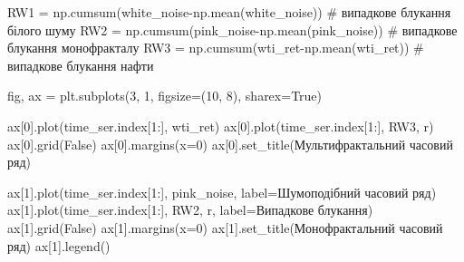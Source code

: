 \documentclass[
  letterpaper,
]{report}
\newenvironment{Shaded}{\begin{snugshade}}{\end{snugshade}}
\newcommand{\CommentTok}[1]{\textcolor[rgb]{0.37,0.37,0.37}{#1}}
\newcommand{\DecValTok}[1]{\textcolor[rgb]{0.68,0.00,0.00}{#1}}
\newcommand{\NormalTok}[1]{\textcolor[rgb]{0.00,0.23,0.31}{#1}}
\newcommand{\OperatorTok}[1]{\textcolor[rgb]{0.37,0.37,0.37}{#1}}
\newcommand{\StringTok}[1]{\textcolor[rgb]{0.13,0.47,0.30}{#1}}
\newcommand{\VariableTok}[1]{\textcolor[rgb]{0.07,0.07,0.07}{#1}}
\begin{document}
\begin{Shaded}
\begin{Highlighting}[]
\NormalTok{RW1 }\OperatorTok{=}\NormalTok{ np.cumsum(white\_noise}\OperatorTok{{-}}\NormalTok{np.mean(white\_noise)) }\CommentTok{\# випадкове блукання білого шуму}
\NormalTok{RW2 }\OperatorTok{=}\NormalTok{ np.cumsum(pink\_noise}\OperatorTok{{-}}\NormalTok{np.mean(pink\_noise))   }\CommentTok{\# випадкове блукання монофракталу}
\NormalTok{RW3 }\OperatorTok{=}\NormalTok{ np.cumsum(wti\_ret}\OperatorTok{{-}}\NormalTok{np.mean(wti\_ret))         }\CommentTok{\# випадкове блукання нафти}
\end{Highlighting}
\end{Shaded}

\begin{Shaded}
\begin{Highlighting}[]
\NormalTok{fig, ax }\OperatorTok{=}\NormalTok{ plt.subplots(}\DecValTok{3}\NormalTok{, }\DecValTok{1}\NormalTok{, figsize}\OperatorTok{=}\NormalTok{(}\DecValTok{10}\NormalTok{, }\DecValTok{8}\NormalTok{), sharex}\OperatorTok{=}\VariableTok{True}\NormalTok{)}

\NormalTok{ax[}\DecValTok{0}\NormalTok{].plot(time\_ser.index[}\DecValTok{1}\NormalTok{:], wti\_ret)}
\NormalTok{ax[}\DecValTok{0}\NormalTok{].plot(time\_ser.index[}\DecValTok{1}\NormalTok{:], RW3, }\StringTok{\textquotesingle{}r\textquotesingle{}}\NormalTok{)}
\NormalTok{ax[}\DecValTok{0}\NormalTok{].grid(}\VariableTok{False}\NormalTok{)}
\NormalTok{ax[}\DecValTok{0}\NormalTok{].margins(x}\OperatorTok{=}\DecValTok{0}\NormalTok{)}
\NormalTok{ax[}\DecValTok{0}\NormalTok{].set\_title(}\StringTok{\textquotesingle{}Мультифрактальний часовий ряд\textquotesingle{}}\NormalTok{)}

\NormalTok{ax[}\DecValTok{1}\NormalTok{].plot(time\_ser.index[}\DecValTok{1}\NormalTok{:], pink\_noise, label}\OperatorTok{=}\StringTok{\textquotesingle{}Шумоподібний часовий ряд\textquotesingle{}}\NormalTok{)}
\NormalTok{ax[}\DecValTok{1}\NormalTok{].plot(time\_ser.index[}\DecValTok{1}\NormalTok{:], RW2, }\StringTok{\textquotesingle{}r\textquotesingle{}}\NormalTok{, label}\OperatorTok{=}\StringTok{\textquotesingle{}Випадкове блукання\textquotesingle{}}\NormalTok{)}
\NormalTok{ax[}\DecValTok{1}\NormalTok{].grid(}\VariableTok{False}\NormalTok{)}
\NormalTok{ax[}\DecValTok{1}\NormalTok{].margins(x}\OperatorTok{=}\DecValTok{0}\NormalTok{)}
\NormalTok{ax[}\DecValTok{1}\NormalTok{].set\_title(}\StringTok{\textquotesingle{}Монофрактальний часовий ряд\textquotesingle{}}\NormalTok{)}
\NormalTok{ax[}\DecValTok{1}\NormalTok{].legend()}


\end{Highlighting}
\end{Shaded}
\end{document}

